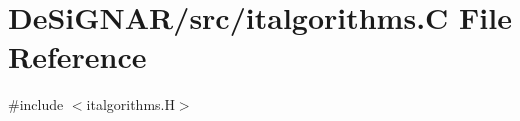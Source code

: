 \hypertarget{italgorithms_8_c}{}\section{De\+Si\+G\+N\+A\+R/src/italgorithms.C File Reference}
\label{italgorithms_8_c}
{\ttfamily \#include $<$italgorithms.\+H$>$}\newline
